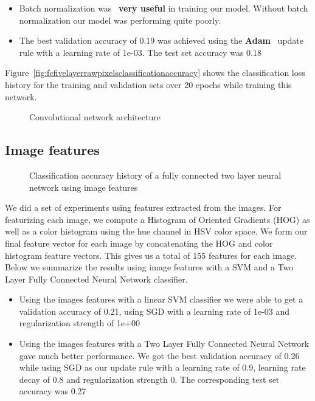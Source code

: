 \begin{itemize}[noitemsep]
\item Batch normalization was~\cite{ioffe2015batch} \textbf{very useful} in training our model. Without batch normalization our model was performing quite poorly.
\item The best validation accuracy of 0.19 was achieved using the \textbf{Adam}~\cite{kingma2014adam} update rule with a learning rate of 1e-03. The test set accuracy was 0.18   
\end{itemize}

Figure~\ref{fig:fcfivelayerrawpixelsclassificationaccuracy} shows the classification loss history for the training and validation sets over 20 epochs while training this network.

\begin{figure*}[h!]
\centering
  \caption{Convolutional network architecture}
  \label{fig:convnetarchitecture}
\end{figure*}

\subsection{Image features}
\label{subsec:imagefeatures}


\begin{figure}[h!]
\centering
  \caption{Classification accuracy history of a fully connected two layer neural network using image features}
  \label{fig:imagefeaturesfctwolayerclassificationaccuracy}
\end{figure}

We did a set of experiments using features extracted from the images. For featurizing each image, we compute a Histogram of Oriented Gradients (HOG) as well as a color histogram using the hue channel in HSV color space. We form our final feature vector for each image by concatenating the HOG and color histogram feature vectors. This gives us a total of 155 features for each image. Below we summarize the results using image features with a SVM and a Two Layer Fully Connected Neural Network classifier.

\begin{itemize}[noitemsep]
\item Using the images features with a linear SVM classifier we were able to get a validation accuracy of 0.21, using SGD with a learning rate of 1e-03 and regularization strength of 1e+00
\item Using the images features with a Two Layer Fully Connected Neural Network gave much better performance. We got the best validation accuracy of 0.26 while using SGD as our update rule with a learning rate of 0.9, learning rate decay of 0.8 and regularization strength 0. The corresponding test set accuracy was 0.27   
\end{itemize}

